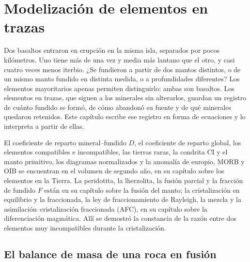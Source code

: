 \chapter{Modelización de elementos en trazas}\label{ch:b3:trace-element-modelling}

Dos basaltos entraron en erupción en la misma isla, separados por pocos kilómetros.
Uno tiene más de una vez y media más lantano que el otro, y casi cuatro veces menos iterbio.
¿Se fundieron a partir de dos mantos distintos, o de un mismo manto fundido en distinta medida,
o a profundidades diferentes? Los elementos mayoritarios apenas permiten distinguirlo: ambas son basaltos.
Los elementos en trazas, que siguen a los minerales sin alterarlos, guardan un registro de cuánto fundido se formó,
de cómo abandonó su fuente y de qué minerales quedaron retenidos.
Este capítulo escribe ese registro en forma de ecuaciones
y lo interpreta a partir de ellas.

\begin{recall}
El coeficiente de reparto mineral--fundido $D$, el coeficiente de reparto global,
los elementos compatibles e incompatibles, las tierras raras, la condrita CI
y el manto primitivo, los diagramas normalizados y la anomalía de europio,
MORB y OIB se encuentran en el volumen de segundo año, en su capítulo sobre los elementos en la
Tierra. La peridotita, la lherzolita, la fusión parcial y la fracción de fundido $F$
están en su capítulo sobre la fusión del manto; la cristalización en equilibrio y la fraccionada,
la ley de fraccionamiento de Rayleigh, la mezcla y la
asimilación--cristalización fraccionada (AFC), en su capítulo sobre la
diferenciación magmática. Allí se demostró la constancia de la razón entre dos elementos muy
incompatibles durante la cristalización.
\end{recall}

\section{El balance de masa de una roca en fusión}\label{sec:b3:trace-element-modelling:balance}

